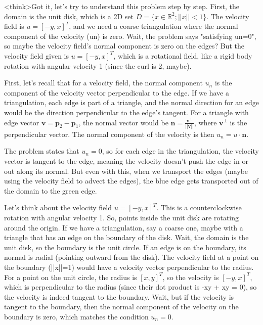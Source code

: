 <think>Got it, let's try to understand this problem step by step. First, the domain is the unit disk, which is a 2D set \( D = \{x \in \mathbb{R}^2; ||x|| < 1\} \). The velocity field is \( u = [-y, x]^T \), and we need a coarse triangulation where the normal component of the velocity (un) is zero. Wait, the problem says "satisfying un=0", so maybe the velocity field's normal component is zero on the edges? But the velocity field given is \( u = [-y, x]^T \), which is a rotational field, like a rigid body rotation with angular velocity 1 (since the curl is 2, maybe). 

First, let's recall that for a velocity field, the normal component \( u_n \) is the component of the velocity vector perpendicular to the edge. If we have a triangulation, each edge is part of a triangle, and the normal direction for an edge would be the direction perpendicular to the edge's tangent. For a triangle with edge vector \( \mathbf{v} = \mathbf{p}_2 - \mathbf{p}_1 \), the normal vector would be \( \mathbf{n} = \frac{\mathbf{v}^\perp}{||\mathbf{v}||} \), where \( \mathbf{v}^\perp \) is the perpendicular vector. The normal component of the velocity is then \( u_n = u \cdot \mathbf{n} \). 

The problem states that \( u_n = 0 \), so for each edge in the triangulation, the velocity vector is tangent to the edge, meaning the velocity doesn't push the edge in or out along its normal. But even with this, when we transport the edges (maybe using the velocity field to advect the edges), the blue edge gets transported out of the domain to the green edge. 

Let's think about the velocity field \( u = [-y, x]^T \). This is a counterclockwise rotation with angular velocity 1. So, points inside the unit disk are rotating around the origin. If we have a triangulation, say a coarse one, maybe with a triangle that has an edge on the boundary of the disk. Wait, the domain is the unit disk, so the boundary is the unit circle. If an edge is on the boundary, its normal is radial (pointing outward from the disk). The velocity field at a point on the boundary (||x||=1) would have a velocity vector perpendicular to the radius. For a point on the unit circle, the radius is \( [x, y]^T \), so the velocity is \( [-y, x]^T \), which is perpendicular to the radius (since their dot product is -xy + xy = 0), so the velocity is indeed tangent to the boundary. Wait, but if the velocity is tangent to the boundary, then the normal component of the velocity on the boundary is zero, which matches the condition \( u_n = 0 \). 

